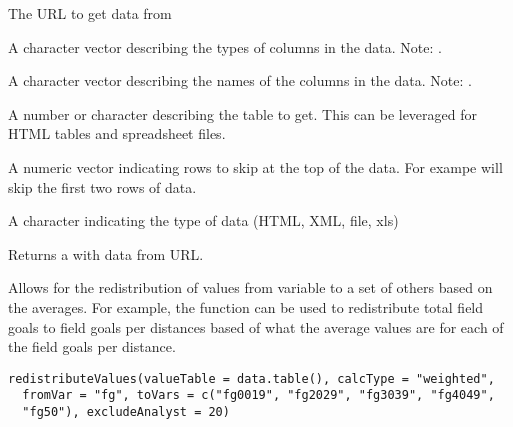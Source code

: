 \documentclass[a4paper]{book}
\begin{document}
\begin{Arguments}
\begin{ldescription}
\item[\code{inpUrl}] The URL to get data from

\item[\code{columnTypes}] A character vector describing the types of columns in the
data. Note: .

\item[\code{columnNames}] A character vector describing the names of the columns in
the data. Note: .

\item[\code{whichTable}] A number or character describing the table to get. This
can be leveraged for HTML tables and spreadsheet files.

\item[\code{removeRow}] A numeric vector indicating rows to skip at the top of the data.
For exampe  will skip the first two rows of data.

\item[\code{dataType}] A character indicating the type of data (HTML, XML, file, xls)
\end{ldescription}
\end{Arguments}
%
\begin{Value}
Returns a  with data from URL.
\end{Value}
%
\begin{Description}\relax
Allows for the redistribution of values from  variable to a set of
others based on the averages. For example, the function can be used to
redistribute total field goals to field goals per distances based of what
the average values are for each of the field goals per distance.
\end{Description}
%
\begin{Usage}
\begin{verbatim}
redistributeValues(valueTable = data.table(), calcType = "weighted",
  fromVar = "fg", toVars = c("fg0019", "fg2029", "fg3039", "fg4049",
  "fg50"), excludeAnalyst = 20)
\end{verbatim}
\end{Usage}
%
\end{document}
